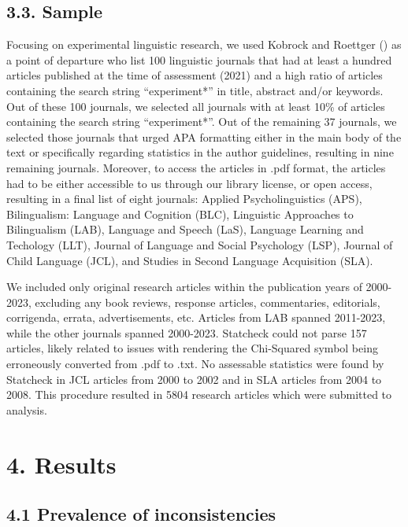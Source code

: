 \documentclass[
  doc,
  longtable,
  nolmodern,
  notxfonts,
  notimes,
  colorlinks=true,linkcolor=blue,citecolor=blue,urlcolor=blue]{apa7}
\begin{document}
\subsection{3.3. Sample}\label{sample}

Focusing on experimental linguistic research, we used Kobrock and
Roettger () as a point of
departure who list 100 linguistic journals that had at least a hundred
articles published at the time of assessment (2021) and a high ratio of
articles containing the search string ``experiment*'' in title, abstract
and/or keywords. Out of these 100 journals, we selected all journals
with at least 10\% of articles containing the search string
``experiment*''. Out of the remaining 37 journals, we selected those
journals that urged APA formatting either in the main body of the text
or specifically regarding statistics in the author guidelines, resulting
in nine remaining journals. Moreover, to access the articles in .pdf
format, the articles had to be either accessible to us through our
library license, or open access, resulting in a final list of eight
journals: Applied Psycholinguistics (APS), Bilingualism: Language and
Cognition (BLC), Linguistic Approaches to Bilingualism (LAB), Language
and Speech (LaS), Language Learning and Techology (LLT), Journal of
Language and Social Psychology (LSP), Journal of Child Language (JCL),
and Studies in Second Language Acquisition (SLA).

We included only original research articles within the publication years
of 2000-2023, excluding any book reviews, response articles,
commentaries, editorials, corrigenda, errata, advertisements, etc.
Articles from LAB spanned 2011-2023, while the other journals spanned
2000-2023. Statcheck could not parse 157 articles, likely related to
issues with rendering the Chi-Squared symbol being erroneously converted
from .pdf to .txt. No assessable statistics were found by Statcheck in
JCL articles from 2000 to 2002 and in SLA articles from 2004 to 2008.
This procedure resulted in 5804 research articles which were submitted
to analysis.

\section{4. Results}\label{results}

\subsection{4.1 Prevalence of
inconsistencies}\label{prevalence-of-inconsistencies}
\end{document}
